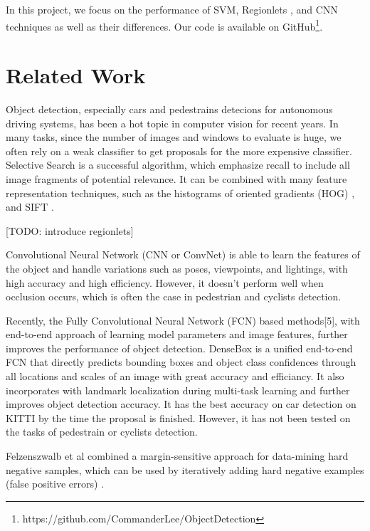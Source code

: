 \documentclass{article} %
\begin{document}
In this project, we focus on the performance of SVM, Regionlets \cite{Wang2013}, and CNN techniques as well as their differences. Our code is available on GitHub\footnote{https://github.com/CommanderLee/ObjectDetection}.


\section{Related Work}

Object detection, especially cars and pedestrains detecions for autonomous driving systems, has been a hot topic in computer vision for recent years. In many tasks, since the number of images and windows to evaluate is huge, we often rely on a weak classifier to get proposals for the more expensive classifier. Selective Search \cite{van2011segmentation} is a successful algorithm, which emphasize recall to include all image fragments of potential relevance. It can be combined with many feature representation techniques, such as the histograms of oriented gradients (HOG) \cite{dalal2005histograms}, and SIFT \cite{lowe2004distinctive}. 

[TODO: introduce regionlets]

Convolutional Neural
Network (CNN or ConvNet) \cite{Krizhevsky2012} is able to learn the features of the object and handle variations such as poses, viewpoints, and lightings, with high accuracy and high efficiency. However, it doesn't perform well when occlusion occurs, which is often the case in pedestrian and cyclists detection. 

Recently, the Fully Convolutional Neural Network (FCN) based methods[5], with end-to-end approach of learning model parameters and image features, further improves the performance of object detection. DenseBox \cite{Huang2015} is a unified end-to-end FCN that
directly predicts bounding boxes and object class confidences through all locations
and scales of an image with great accuracy and efficiancy. It also incorporates with landmark localization during multi-task learning and further improves
object detection accuracy. It has the best accuracy on car detection on KITTI by the time the proposal is finished. However, it has not been tested on the tasks of pedestrain or cyclists detection.

Felzenszwalb et al \cite{felzenszwalb2010object} combined a margin-sensitive approach for data-mining hard negative samples, which can be used by iteratively adding hard negative examples (false positive errors) \cite{van2011segmentation}.
\end{document}
